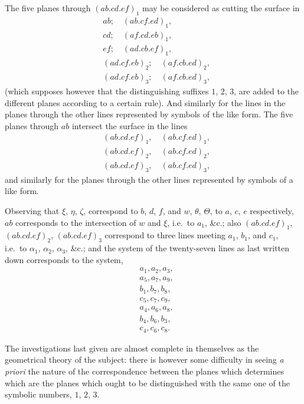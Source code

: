 \documentclass[11pt,a4paper]{book}
\begin{document}
The five planes through $(ab.cd.ef)_{1}$ may be considered as cutting the surface in
\begin{align*}
&ab; \quad (ab.cf.ed)_{1}, \\
&cd; \quad (af.cd.eb)_{1}, \\
&ef; \quad (ad.cb.ef)_{1}, \\
&(ad.cf.eb)_{2}; \quad (af.cb.ed)_{2}, \\
&(ad.cf.eb)_{3}; \quad (af.cb.ed)_{3},
\end{align*}
(which supposes however that the distinguishing suffixes $1$, $2$, $3$, are added to the different planes according to a certain rule). And similarly for the lines in the planes through the other lines represented by symbols of the like form. The five planes through $ab$ intersect the surface in the lines
\begin{align*}
&(ab.cd.ef)_{1}, \quad (ab.cf.ed)_{1}, \\
&(ab.cd.ef)_{2}, \quad (ab.cf.ed)_{2}, \\
&(ab.cd.ef)_{3}, \quad (ab.cf.ed)_{3},
\end{align*}
and similarly for the planes through the other lines represented by symbols of a like form.

Observing that $\xi$, $\eta$, $\zeta$, correspond to $b$, $d$, $f$, and $w$, $\theta$, $\Theta$, to $a$, $c$, $e$ respectively, $ab$ corresponds to the intersection of $w$ and $\xi$, i.e.\ to $a_{1}$, \&c.; also $(ab.cd.ef)_{1}$, $(ab.cd.ef)_{2}$, $(ab.cd.ef)_{3}$ correspond to three lines meeting $a_{1}$, $b_{1}$, and $c_{1}$, i.e.\ to $\alpha_{1}$, $\alpha_{2}$, $\alpha_{3}$, \&c.; and the system of the twenty-seven lines as last written down corresponds to the system,
\begin{align*}
&a_{1}, a_{2}, a_{3}, \\
&a_{5}, a_{7}, a_{9}, \\
&b_{1}, b_{7}, b_{8}, \\
&c_{5}, c_{7}, c_{9}, \\
&a_{4}, a_{6}, a_{8}, \\
&b_{4}, b_{6}, b_{3}, \\
&c_{4}, c_{6}, c_{8}.
\end{align*}

The investigations last given are almost complete in themselves as the geometrical theory of the subject: there is however some difficulty in seeing \textit{a priori} the nature of the correspondence between the planes which determines which are the planes which ought to be distinguished with the same one of the symbolic numbers, $1$, $2$, $3$.
\end{document}
